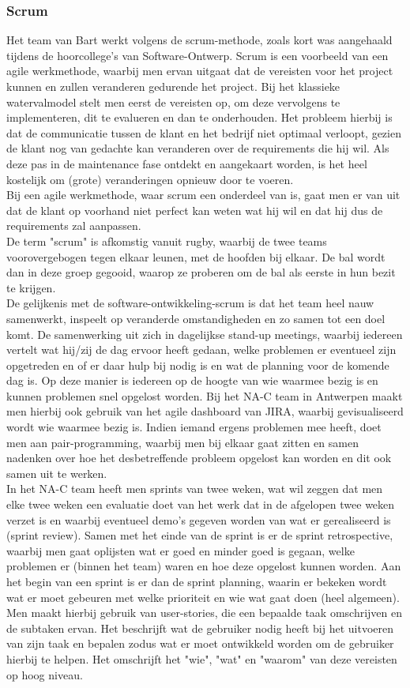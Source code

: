 \documentclass[10pt,a4paper]{article}
\begin{document}
\subsubsection{Scrum}
Het team van Bart werkt volgens de scrum-methode, zoals kort was aangehaald tijdens de hoorcollege's van Software-Ontwerp. Scrum is een voorbeeld van een agile werkmethode, waarbij men ervan uitgaat dat de vereisten voor het project kunnen en zullen veranderen gedurende het project. 
Bij het klassieke watervalmodel stelt men eerst de vereisten op, om deze vervolgens te implementeren, dit te evalueren en dan te onderhouden. Het probleem hierbij is dat de communicatie tussen de klant en het bedrijf 
niet optimaal verloopt, gezien de klant nog van gedachte kan veranderen over de requirements die hij wil. Als deze pas in de maintenance fase ontdekt en aangekaart worden, is het heel kostelijk om (grote) veranderingen opnieuw door te voeren.\\
Bij een agile werkmethode, waar scrum een onderdeel van is, gaat men er van uit dat de klant op voorhand niet perfect kan weten wat hij wil en dat hij dus de requirements zal aanpassen.\\
De term "scrum" is afkomstig vanuit rugby, waarbij de twee teams voorovergebogen tegen elkaar leunen, met de hoofden bij elkaar. De bal wordt dan in deze groep gegooid, waarop ze proberen om de bal als eerste in hun bezit te krijgen.\\
De gelijkenis met de software-ontwikkeling-scrum is dat het team heel nauw samenwerkt, inspeelt op veranderde omstandigheden en zo samen tot een doel komt. De samenwerking uit zich in dagelijkse stand-up meetings, waarbij iedereen vertelt wat hij/zij de dag ervoor heeft gedaan, welke problemen er eventueel zijn opgetreden en of er daar hulp bij nodig is en wat de planning voor de komende dag is. Op deze manier is iedereen op de hoogte van wie waarmee bezig is en kunnen problemen snel opgelost worden. Bij het NA-C team in Antwerpen maakt men hierbij ook gebruik van het agile dashboard van JIRA, waarbij gevisualiseerd wordt wie waarmee bezig is.  Indien iemand ergens problemen mee heeft, doet men aan pair-programming, waarbij men bij elkaar gaat zitten en samen nadenken over hoe het desbetreffende probleem opgelost kan worden en dit ook samen uit te werken.\\
In het NA-C team heeft men sprints van twee weken, wat wil zeggen dat men elke twee weken een evaluatie doet van het werk dat in de afgelopen twee weken verzet is en waarbij eventueel demo's gegeven worden van wat er gerealiseerd is (sprint review). Samen met het einde van de sprint is er de sprint retrospective, waarbij men gaat oplijsten wat er goed en minder goed is gegaan, welke problemen er (binnen het team) waren en hoe deze opgelost kunnen worden. Aan het begin van een sprint is er dan de sprint planning, waarin er bekeken wordt wat er moet gebeuren met welke prioriteit en wie wat gaat doen (heel algemeen). Men maakt hierbij gebruik van user-stories, die een bepaalde taak omschrijven en de subtaken ervan. Het beschrijft wat de gebruiker nodig heeft bij het uitvoeren van zijn taak en bepalen zodus wat er moet ontwikkeld worden om de gebruiker hierbij te helpen. Het omschrijft het "wie", "wat" en "waarom" van deze vereisten op hoog niveau.
\end{document}
